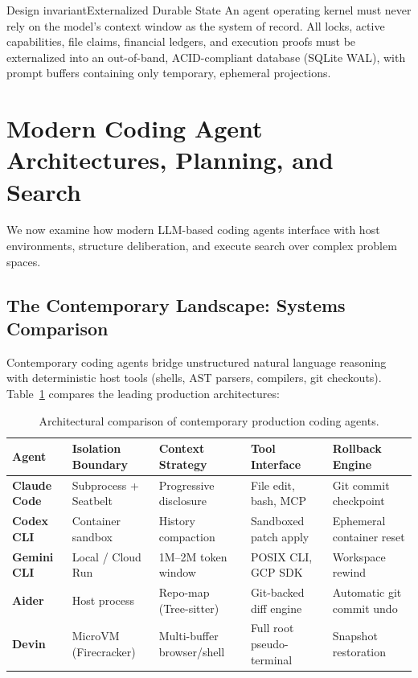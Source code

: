 \documentclass[11pt,a4paper]{article}
\begin{document}
\begin{pdclaim}{Design invariant}{Externalized Durable State}\label{req:external-state}
An agent operating kernel must never rely on the model's context window as the system of record. All locks, active capabilities, file claims, financial ledgers, and execution proofs must be externalized into an out-of-band, ACID-compliant database (SQLite WAL), with prompt buffers containing only temporary, ephemeral projections.
\end{pdclaim}

\section{Modern Coding Agent Architectures, Planning, and Search}\label{sec:prereq-coding-agents}

We now examine how modern LLM-based coding agents interface with host environments, structure deliberation, and execute search over complex problem spaces.

\subsection{The Contemporary Landscape: Systems Comparison}

Contemporary coding agents bridge unstructured natural language reasoning with deterministic host tools (shells, AST parsers, compilers, git checkouts). Table~\ref{tab:coding-agents} compares the leading production architectures:

\begin{table}[H]
\centering
\footnotesize
\setlength{\tabcolsep}{2.5pt}
\begin{tabularx}{\textwidth}{l >{\raggedright\arraybackslash}X >{\raggedright\arraybackslash}X >{\raggedright\arraybackslash}X >{\raggedright\arraybackslash}X}
\toprule
\textbf{Agent} & \textbf{Isolation Boundary} & \textbf{Context Strategy} & \textbf{Tool Interface} & \textbf{Rollback Engine} \\
\midrule
\textbf{Claude Code} & Subprocess + Seatbelt & Progressive disclosure & File edit, bash, MCP & Git commit checkpoint \\
\textbf{Codex CLI} & Container sandbox & History compaction & Sandboxed patch apply & Ephemeral container reset \\
\textbf{Gemini CLI} & Local / Cloud Run & 1M--2M token window & POSIX CLI, GCP SDK & Workspace rewind \\
\textbf{Aider} & Host process & Repo-map (Tree-sitter) & Git-backed diff engine & Automatic git commit undo \\
\textbf{Devin} & MicroVM (Firecracker) & Multi-buffer browser/shell & Full root pseudo-terminal & Snapshot restoration \\
\bottomrule
\end{tabularx}
\caption{Architectural comparison of contemporary production coding agents.}
\label{tab:coding-agents}
\end{table}
\end{document}
